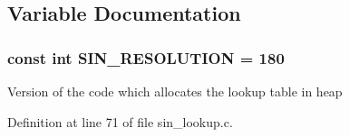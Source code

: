 \subsection{\-Variable \-Documentation}
\hypertarget{group___tau_labs_math_gace095cad8be21b689623bd604ea20aaa}{
\subsubsection[{\-S\-I\-N\-\_\-\-R\-E\-S\-O\-L\-U\-T\-I\-O\-N}]{\setlength{\rightskip}{0pt plus 5cm}const int {\bf \-S\-I\-N\-\_\-\-R\-E\-S\-O\-L\-U\-T\-I\-O\-N} = 180}}\label{group___tau_labs_math_gace095cad8be21b689623bd604ea20aaa}
\-Version of the code which allocates the lookup table in heap 

\-Definition at line 71 of file sin\-\_\-lookup.\-c.

